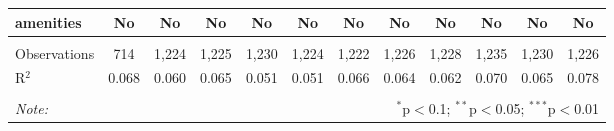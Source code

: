 \begin{table}[!htbp]
\begin{tabular}{@{\extracolsep{5pt}}lccccccccccc}
amenities & No & No & No & No & No & No & No & No & No & No & No \\ 
\hline \\[-1.8ex] 
Observations & 714 & 1,224 & 1,225 & 1,230 & 1,224 & 1,222 & 1,226 & 1,228 & 1,235 & 1,230 & 1,226 \\ 
R$^{2}$ & 0.068 & 0.060 & 0.065 & 0.051 & 0.051 & 0.066 & 0.064 & 0.062 & 0.070 & 0.065 & 0.078 \\ 
\hline 
\hline \\[-1.8ex] 
\textit{Note:}  & \multicolumn{11}{r}{$^{*}$p$<$0.1; $^{**}$p$<$0.05; $^{***}$p$<$0.01} \\ 
\end{tabular} 
\end{table} 
